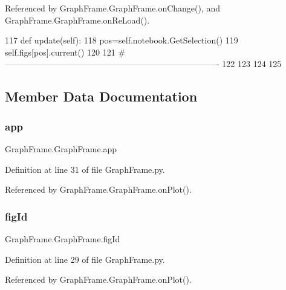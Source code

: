 Referenced by Graph\+Frame.\+Graph\+Frame.\+on\+Change(), and Graph\+Frame.\+Graph\+Frame.\+on\+Re\+Load().


\begin{DoxyCode}
117     \textcolor{keyword}{def }update(self):
118         pos=self.notebook.GetSelection()
119         self.figs[pos].current()
120 
121 \textcolor{comment}{#----------------------------------------------------------------------------}
122 
123 
124 
125 \end{DoxyCode}


\subsection{Member Data Documentation}
\mbox{\label{classGraphFrame_1_1GraphFrame_adffc22a75c32a310a9f15d5d9d39c585}} 
\subsubsection{\texorpdfstring{app}{app}}
{\footnotesize\ttfamily Graph\+Frame.\+Graph\+Frame.\+app}



Definition at line 31 of file Graph\+Frame.\+py.



Referenced by Graph\+Frame.\+Graph\+Frame.\+on\+Plot().

\mbox{\label{classGraphFrame_1_1GraphFrame_a7075285ad02fd2080b89030d8b2b4f1f}} 
\subsubsection{\texorpdfstring{fig\+Id}{figId}}
{\footnotesize\ttfamily Graph\+Frame.\+Graph\+Frame.\+fig\+Id}



Definition at line 29 of file Graph\+Frame.\+py.



Referenced by Graph\+Frame.\+Graph\+Frame.\+on\+Plot().

\mbox{\label{classGraphFrame_1_1GraphFrame_ab8a1a588df91f01631e4af5f72e8a581}} 

